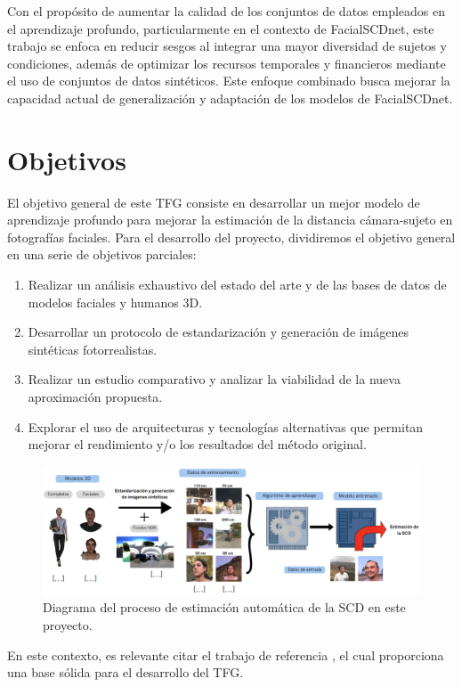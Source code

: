 Con el propósito de aumentar la calidad de los conjuntos de datos empleados en el aprendizaje profundo, particularmente en el contexto de FacialSCDnet, este trabajo se enfoca en reducir sesgos al integrar una mayor diversidad de sujetos y condiciones, además de optimizar los recursos temporales y financieros mediante el uso de conjuntos de datos sintéticos. Este enfoque combinado busca mejorar la capacidad actual de generalización y adaptación de los modelos de FacialSCDnet.

\section{Objetivos}
 El objetivo general de este TFG consiste en desarrollar un mejor modelo de aprendizaje profundo para mejorar la estimación de la distancia cámara-sujeto en fotografías faciales. Para el desarrollo del proyecto, dividiremos el objetivo general en una serie de objetivos parciales:
\begin{enumerate}
    \item Realizar un análisis exhaustivo del estado del arte y de las bases de datos de modelos faciales y humanos 3D.
    \item Desarrollar un protocolo de estandarización y generación de imágenes sintéticas fotorrealistas.
    \item Realizar un estudio comparativo y analizar la viabilidad de la nueva aproximación propuesta.
    \item Explorar el uso de arquitecturas y tecnologías alternativas que permitan mejorar el rendimiento y/o los resultados del método original.
\end{enumerate}

\begin{figure}[h]
	\centering
	\includegraphics[scale=0.35]{imagenes/cap1/resumen.png}
	\caption[Diagrama del proyecto.]{Diagrama del proceso de estimación automática de la SCD en este proyecto.}
	\label{fig3}
\end{figure}

En este contexto, es relevante citar el trabajo de referencia \cite{14}, el cual proporciona una base sólida para el desarrollo del TFG.


